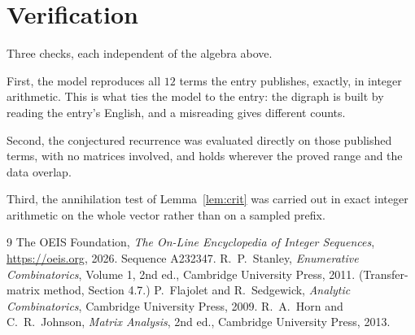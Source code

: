 \documentclass[11pt,a4paper]{article}
\theoremstyle{plain}
\theoremstyle{definition}
\begin{document}
\section{Verification}

Three checks, each independent of the algebra above.

First, the model reproduces all $12$ terms the entry publishes, exactly, in integer
arithmetic. This is what ties the model to the entry: the digraph is built by reading the
entry's English, and a misreading gives different counts.

Second, the conjectured recurrence was evaluated directly on those published terms, with no
matrices involved, and holds wherever the proved range and the data overlap.

Third, the annihilation test of Lemma~\ref{lem:crit} was carried out in exact integer
arithmetic on the whole vector rather than on a sampled prefix.

\begin{thebibliography}{9}
 The OEIS Foundation, \emph{The On-Line Encyclopedia of Integer
Sequences}, \url{https://oeis.org}, 2026. Sequence A232347.
 R.~P.~Stanley, \emph{Enumerative Combinatorics}, Volume 1, 2nd ed.,
Cambridge University Press, 2011. (Transfer-matrix method, Section 4.7.)
 P.~Flajolet and R.~Sedgewick, \emph{Analytic Combinatorics}, Cambridge
University Press, 2009.
 R.~A.~Horn and C.~R.~Johnson, \emph{Matrix Analysis}, 2nd ed., Cambridge
University Press, 2013.
\end{thebibliography}
\end{document}
